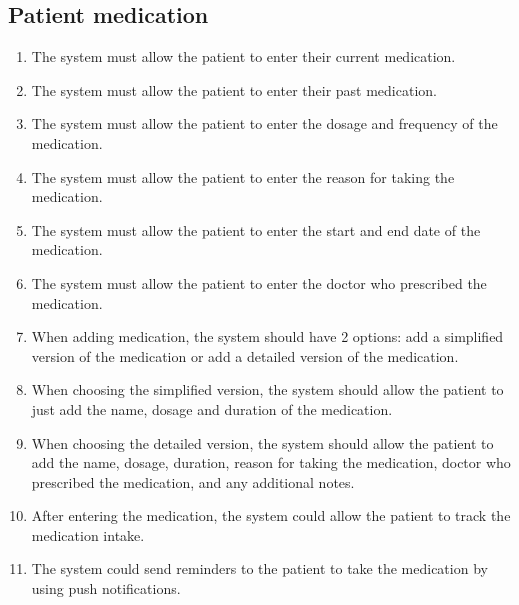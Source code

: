 \subsection{Patient medication}
\begin{enumerate}
    \item The system must allow the patient to enter their current medication.
    \item The system must allow the patient to enter their past medication.
    \item The system must allow the patient to enter the dosage and frequency of the medication.
    \item The system must allow the patient to enter the reason for taking the medication.
    \item The system must allow the patient to enter the start and end date of the medication.
    \item The system must allow the patient to enter the doctor who prescribed the medication.
    \item When adding medication, the system should have 2 options: add a simplified version of the medication or add a detailed version of the medication.
    \item When choosing the simplified version, the system should allow the patient to just add the name, dosage and duration of the medication.
    \item When choosing the detailed version, the system should allow the patient to add the name, dosage, duration, reason for taking the medication, doctor who prescribed the medication, and any additional notes.
    \item After entering the medication, the system could allow the patient to track the medication intake.
    \item The system could send reminders to the patient to take the medication by using push notifications.
\end{enumerate}